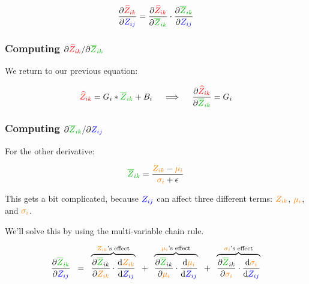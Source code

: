            \begin{equation}
                \pderiv{ \red{\widehat{Z}_{ik}} }{ \blu{Z_{ij}} } = 
                \pderiv{ \red{\widehat{Z}_{ik}} }{ \grn{\overline{Z}_{ik} } } \cdot 
                \pderiv{ \grn{\overline{Z}_{ik}} }{ \blu{Z_{ij}} }
            \end{equation}

        \subsubsection{Computing $\pderivslash{ \red{\widehat{Z}_{ik}} }{ \grn{\overline{Z}_{ik} } }$}

            We return to our previous equation:

            \begin{equation}
                \red{\widehat{Z}_{ik}} = G_i * \grn{\overline{Z}_{ik}} + B_i
                \quad \implies \quad
                \pderiv{ \red{\widehat{Z}_{ik}} }{ \grn{\overline{Z}_{ik} } } = G_i
            \end{equation}

        \subsubsection{Computing $\pderivslash{\grn{\overline{Z}_{ik}}}{\blu{Z_{ij}}}$}

            For the other derivative:

            \begin{equation}
                \grn{\overline{Z}_{ik}}  =  \frac{ \org{Z_{ik} }  - \org{\mu_i}}{\org{\sigma_i}+\epsilon}
            \end{equation}

            This gets a bit complicated, because $\textcolor{blue}{Z_{ij}}$ can affect three different terms: $\textcolor{orange}{Z_{ik}}$, $\textcolor{orange}{\mu_i}$, and $\textcolor{orange}{\sigma_i}$. 

            We'll solve this by using the multi-variable chain rule.

            \begin{equation}
                \pderiv{\grn{\overline{Z}_{ik}}}{\blu{Z_{ij}}} 
                \;\;=\;\;
                \overbrace{
                    \pderiv{\grn{\overline{Z}}_{ik}}{\org{Z_{ik}}} \cdot 
                    \deriv{\org{Z_{ik}}}{\blu{Z_{ij}}}
                }^{\text{$\org{Z_{ik}}$'s effect}}
                \;\;+\;\;
                \overbrace{
                    \pderiv{\grn{\overline{Z}}_{ik}}{\org{\mu_i}} \cdot 
                    \deriv{\org{\mu_i}}{\blu{Z_{ij}}}
                }^{\text{$\org{\mu_i}$'s effect}}
                \;\;+\;\;
                \overbrace{
                    \pderiv{\grn{\overline{Z}}_{ik}}{\org{\sigma_i}} \cdot 
                    \deriv{\org{\sigma_i}}{\blu{Z_{ij}}}
                }^{\text{$\org{\sigma_i}$'s effect}}
            \end{equation}

